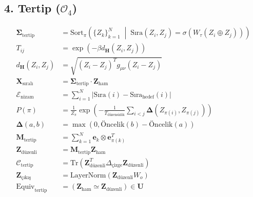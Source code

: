 \documentclass[11pt, a4paper]{article}
\begin{document}
\subsection{4. Tertip ($\mathcal{O}_4$)}
\begin{align}
\mathbf{\Sigma}_{\text{tertip}} &= \text{Sort}_{\pi} \left( \{Z_k\}_{k=1}^N \;\middle|\; \text{Sıra}(Z_i, Z_j) = \sigma(W_\tau (Z_i \oplus Z_j)) \right) \\
T_{ij} &= \exp\left( -\beta d_{\mathbf{H}}(Z_i, Z_j) \right) \\
d_{\mathbf{H}}(Z_i, Z_j) &= \sqrt{(Z_i - Z_j)^T g_{\mu\nu} (Z_i - Z_j)} \\
\mathbf{X}_{\text{sıralı}} &= \mathbf{\Sigma}_{\text{tertip}} \cdot \mathbf{Z}_{\text{ham}} \\
\mathcal{E}_{\text{nizam}} &= \sum_{i=1}^N |\text{Sıra}(i) - \text{Sıra}_{\text{hedef}}(i)| \\
P(\pi) &= \frac{1}{Z_\pi} \exp\left( -\frac{1}{T_{\text{düzensizlik}}} \sum_{i<j} \mathbf{\Delta}(Z_{\pi(i)}, Z_{\pi(j)}) \right) \\
\mathbf{\Delta}(a, b) &= \max\left( 0, \text{Öncelik}(b) - \text{Öncelik}(a) \right) \\
\mathbf{M}_{\text{tertip}} &= \sum_{k=1}^N \mathbf{e}_k \otimes \mathbf{e}_{\pi(k)}^T \\
\mathbf{Z}_{\text{düzenli}} &= \mathbf{M}_{\text{tertip}} \mathbf{Z}_{\text{ham}} \\
\mathcal{C}_{\text{tertip}} &= \text{Tr}(\mathbf{Z}_{\text{düzenli}}^T \Delta_{\text{çizge}} \mathbf{Z}_{\text{düzenli}}) \\
\mathbf{Z}_{\text{çıkış}} &= \text{LayerNorm}(\mathbf{Z}_{\text{düzenli}} W_o) \\
\text{Equiv}_{\text{tertip}} &= (\mathbf{Z}_{\text{ham}} \simeq \mathbf{Z}_{\text{düzenli}}) \in \mathbf{U}
\end{align}
\end{document}
